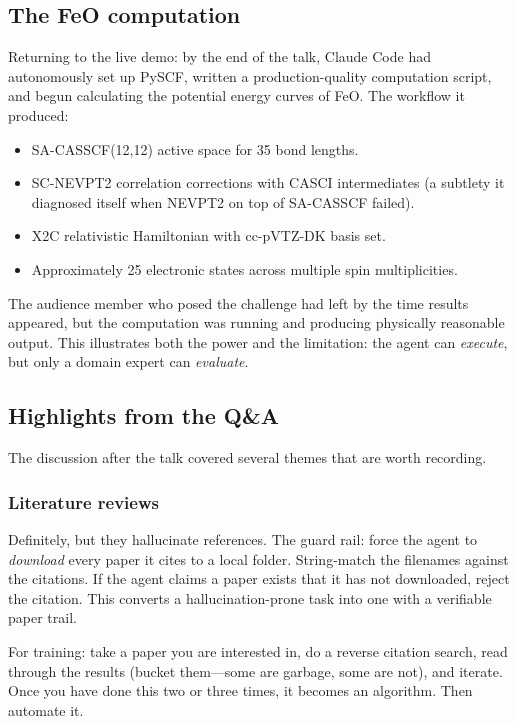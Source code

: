 \subsection{The FeO computation}

Returning to the live demo: by the end of the talk, Claude Code had
autonomously set up PySCF, written a production-quality computation
script, and begun calculating the potential energy curves of FeO\@.  The
workflow it produced:
\begin{itemize}
  \item SA-CASSCF(12,12) active space for 35 bond lengths.
  \item SC-NEVPT2 correlation corrections with CASCI intermediates (a
    subtlety it diagnosed itself when NEVPT2 on top of SA-CASSCF failed).
  \item X2C relativistic Hamiltonian with cc-pVTZ-DK basis set.
  \item Approximately 25 electronic states across multiple spin
    multiplicities.
\end{itemize}

The audience member who posed the challenge had left by the time results
appeared, but the computation was running and producing physically
reasonable output.  This illustrates both the power and the limitation:
the agent can \emph{execute}, but only a domain expert can
\emph{evaluate}.

\subsection{Highlights from the Q\&A}

The discussion after the talk covered several themes that are worth
recording.

\subsubsection{Literature reviews}

\begin{audience}
  Definitely, but they hallucinate references.  The guard rail: force the
  agent to \emph{download} every paper it cites to a local folder.
  String-match the filenames against the citations.  If the agent claims
  a paper exists that it has not downloaded, reject the citation.  This
  converts a hallucination-prone task into one with a verifiable paper
  trail.

  For training: take a paper you are interested in, do a reverse
  citation search, read through the results (bucket them---some are
  garbage, some are not), and iterate.  Once you have done this two or
  three times, it becomes an algorithm.  Then automate it.
\end{audience}

